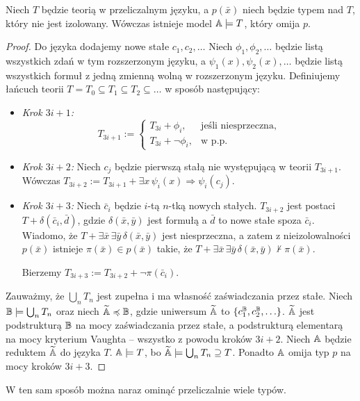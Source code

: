 \documentclass{article}
\begin{document}
\begin{tw}
	\label{tw:omi}
	Niech $T$ będzie teorią w przeliczalnym języku, a $p(\bar{x})$ niech będzie typem nad $T$, który nie jest izolowany.
	Wówczas istnieje model $\mathbb{A} \models T$, który omija $p$.
\end{tw}
\begin{proof}
	Do języka dodajemy nowe stałe $c_1, c_2, \ldots$
	Niech $\phi_1, \phi_2, \ldots $ będzie listą wszystkich zdań w tym rozszerzonym języku, a $\psi_1(x), \psi_2(x), \ldots$ będzie listą wszystkich formuł z jedną zmienną wolną w rozszerzonym języku.
	Definiujemy łańcuch teorii $T = T_0 \subseteq T_1 \subseteq T_2 \subseteq \ldots$
	w sposób następujący:
	\begin{itemize}
		\item \textit{Krok $3i+1$:}
			\[
				 T_{3i+1} := \left\{\begin{array}{lr}
						 T_{3i} + \phi_i, & \text{jeśli niesprzeczna,}\\
						 T_{3i} + \neg \phi_i, & \text{w p.p.}
       						 \end{array}
			\]

		\item \textit{Krok $3i+2$:}
			Niech $c_j$ będzie pierwszą stałą nie występującą w teorii $T_{3i+1}$.
			Wówczas $T_{3i+2} := T_{3i+1} + \exists x \, \psi_i(x) \Rightarrow \psi_i(c_j)$.
		\item \textit{Krok $3i+3$:}
			Niech $\bar{c}_i$ będzie $i$-tą $n$-tką nowych stałych.
			$T_{3i+2}$ jest postaci $T + \delta(\bar{c}_i, \bar{d})$, gdzie $\delta(\bar{x}, \bar{y})$ jest formułą a $\bar{d}$ to nowe stałe spoza $\bar{c}_i$.
			Wiadomo, że $T + \exists \bar{x} \, \exists \bar{y} \, \delta(\bar{x}, \bar{y})$ jest niesprzeczna, a zatem z nieizolowalności $p(\bar{x})$ istnieje $\pi(\bar{x}) \in p(\bar{x})$ takie, że $T + \exists \bar{x} \, \exists \bar{y} \, \delta(\bar{x}, \bar{y}) \not \vdash \pi(\bar{x})$.

			Bierzemy $T_{3i+3} := T_{3i+2} + \neg \pi(\bar{c}_i)$.
	\end{itemize}
	Zauważmy, że $\bigcup_n T_n$ jest zupełna i ma własność zaświadczania przez stałe.
	Niech $\mathbb{B} \models \bigcup_n T_n$ oraz niech $\widetilde{\mathbb{A}} \preccurlyeq \mathbb{B}$, gdzie uniwersum $\widetilde{\mathbb{A}}$ to $\{c_1^{\mathbb{B}}, c_2^{\mathbb{B}}, \ldots\}$.
	$\widetilde{\mathbb{A}}$ jest podstrukturą $\mathbb{B}$ na mocy zaświadczania przez stałe, a podstrukturą elementarą na mocy kryterium Vaughta -- wszystko z powodu kroków $3i+2$.
	Niech $\mathbb{A}$ będzie reduktem $\widetilde{\mathbb{A}}$ do języka $T$.
	$\mathbb{A} \models T$, bo $\widetilde{\mathbb{A}} \models \bigcup_n T_n \supseteq T$.
	Ponadto $\mathbb{A}$ omija typ $p$ na mocy kroków $3i+3$.

\end{proof}
\begin{uw}
	 W ten sam sposób można naraz ominąć przeliczalnie wiele typów.
\end{uw}
\end{document}

